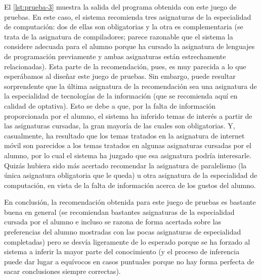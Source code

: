 El \autoref{lst:prueba-3} muestra la salida del programa obtenida con este 
juego de pruebas. En este caso, el sistema recomienda tres asignaturas de la 
especialidad de computación: dos de ellas son obligatorias y la otra es 
complementaria (se trata de la asignatura de compiladores; parece razonable 
que el sistema la considere adecuada para el alumno porque ha cursado la 
asignatura de lenguajes de programación previamente y ambas asignaturas están 
estrechamente relacionadas). Esta parte de la recomendación, pues, es muy 
parecida a lo que esperábamos al diseñar este juego de pruebas. Sin embargo, 
puede resultar sorprendente que la última asignatura de la recomendación sea 
una asignatura de la especialidad de tecnologías de la información (que se 
recomienda aquí en calidad de optativa). Esto se debe a que, por la falta de 
información proporcionada por el alumno, el sistema ha inferido temas de 
interés a partir de las asignaturas cursadas, la gran mayoría de las cuales 
son obligatorias. Y, casualmente, ha resultado que los temas tratados en la 
asignatura de internet móvil son parecidos a los temas tratados en algunas 
asignaturas cursadas por el alumno, por lo cual el sistema ha juzgado que 
esa asignatura podría interesarle. Quizás hubiera sido más acertado recomendar
la asignatura de paralelismo (la única asignatura obligatoria que le queda) 
u otra asignatura de la especialidad de computación, en vista de la falta de 
información acerca de los gustos del alumno.

En conclusión, la recomendación obtenida para este juego de pruebas es 
bastante buena en general (se recomiendan bastantes asignaturas de la 
especialidad cursada por el alumno e incluso se razona de forma acertada 
sobre las preferencias del alumno mostradas con las pocas asignaturas de 
especialidad completadas) pero se desvía ligeramente de lo esperado porque se 
ha forzado al sistema a inferir la mayor parte del conocimiento (y el proceso 
de inferencia puede dar lugar a equívocos en casos puntuales porque no hay 
forma perfecta de sacar conclusiones siempre correctas). 



